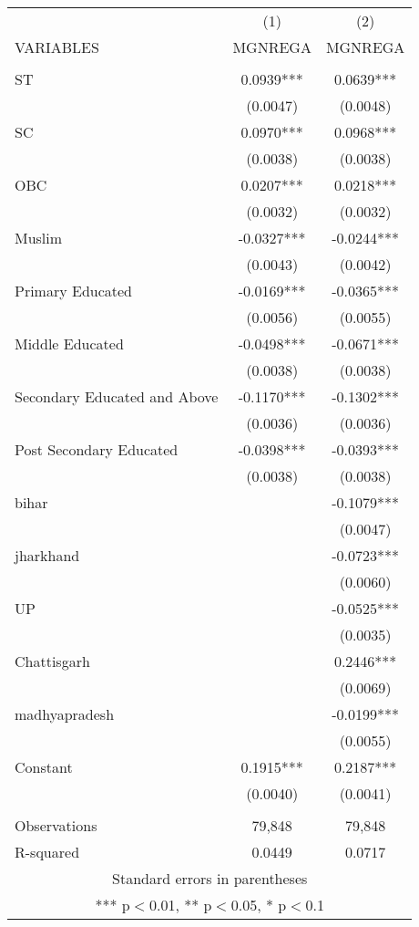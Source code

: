 \documentclass[]{article}
\begin{document}
\begin{tabular}{lcc} \hline
 & (1) & (2) \\
VARIABLES & MGNREGA & MGNREGA \\ \hline
 &  &  \\
ST & 0.0939*** & 0.0639*** \\
 & (0.0047) & (0.0048) \\
SC & 0.0970*** & 0.0968*** \\
 & (0.0038) & (0.0038) \\
OBC & 0.0207*** & 0.0218*** \\
 & (0.0032) & (0.0032) \\
Muslim & -0.0327*** & -0.0244*** \\
 & (0.0043) & (0.0042) \\
Primary Educated & -0.0169*** & -0.0365*** \\
 & (0.0056) & (0.0055) \\
Middle Educated & -0.0498*** & -0.0671*** \\
 & (0.0038) & (0.0038) \\
Secondary Educated and Above & -0.1170*** & -0.1302*** \\
 & (0.0036) & (0.0036) \\
Post Secondary Educated & -0.0398*** & -0.0393*** \\
 & (0.0038) & (0.0038) \\
bihar &  & -0.1079*** \\
 &  & (0.0047) \\
jharkhand &  & -0.0723*** \\
 &  & (0.0060) \\
UP &  & -0.0525*** \\
 &  & (0.0035) \\
Chattisgarh &  & 0.2446*** \\
 &  & (0.0069) \\
madhyapradesh &  & -0.0199*** \\
 &  & (0.0055) \\
Constant & 0.1915*** & 0.2187*** \\
 & (0.0040) & (0.0041) \\
 &  &  \\
Observations & 79,848 & 79,848 \\
 R-squared & 0.0449 & 0.0717 \\ \hline
\multicolumn{3}{c}{ Standard errors in parentheses} \\
\multicolumn{3}{c}{ *** p$<$0.01, ** p$<$0.05, * p$<$0.1} \\
\end{tabular}
\end{document}
